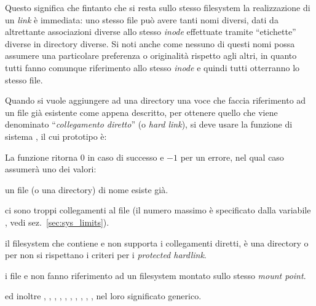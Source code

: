 Questo significa che fintanto che si resta sullo stesso filesystem la
realizzazione di un \textit{link} è immediata: uno stesso file può avere tanti
nomi diversi, dati da altrettante associazioni diverse allo stesso
\textit{inode} effettuate tramite ``etichette'' diverse in directory
diverse. Si noti anche come nessuno di questi nomi possa assumere una
particolare preferenza o originalità rispetto agli altri, in quanto tutti
fanno comunque riferimento allo stesso \textit{inode} e quindi tutti
otterranno lo stesso file.

Quando si vuole aggiungere ad una directory una voce che faccia riferimento ad
un file già esistente come appena descritto, per ottenere quello che viene
denominato ``\textsl{collegamento diretto}'' (o \textit{hard link}), si deve
usare la funzione di sistema , il cui prototipo è:

\begin{funcproto}{
}
{La funzione ritorna $0$ in caso di successo e $-1$ per un errore,
  nel qual caso  assumerà uno dei valori: 
  \begin{errlist}
  \item[\errcode{EEXIST}] un file (o una directory) di nome 
    esiste già.
  \item[\errcode{EMLINK}] ci sono troppi collegamenti al file 
    (il numero massimo è specificato dalla variabile , vedi
    sez.~\ref{sec:sys_limits}).
  \item[\errcode{EPERM}] il filesystem che contiene  e
     non supporta i collegamenti diretti, è una directory o per
     non si rispettano i criteri per i \textit{protected
      hardlink}.\footnotemark 
  \item[\errcode{EXDEV}] i file  e  non fanno
    riferimento ad un filesystem montato sullo stesso 
    \textit{mount point}.
  \end{errlist} ed inoltre , , ,
  , , , ,
  , , ,  nel loro
  significato generico.}
\end{funcproto}


